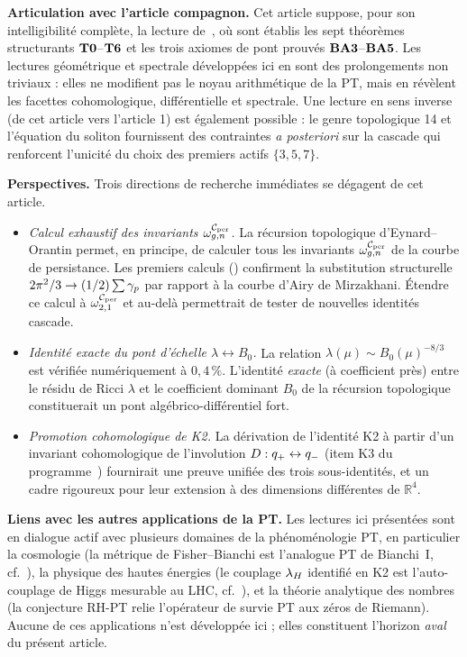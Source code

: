 \textbf{Articulation avec l'article compagnon.} Cet article suppose, pour son intelligibilité complète, la lecture de~\cite{PT_Article1_Foundations}, où sont établis les sept théorèmes structurants $\textbf{T0}$--$\textbf{T6}$ et les trois axiomes de pont prouvés $\textbf{BA3}$--$\textbf{BA5}$. Les lectures géométrique et spectrale développées ici en sont des prolongements non triviaux : elles ne modifient pas le noyau arithmétique de la PT, mais en révèlent les facettes cohomologique, différentielle et spectrale. Une lecture en sens inverse (de cet article vers l'article 1) est également possible : le genre topologique 14 et l'équation du soliton fournissent des contraintes \emph{a posteriori} sur la cascade qui renforcent l'unicité du choix des premiers actifs $\{3, 5, 7\}$.

\textbf{Perspectives.} Trois directions de recherche immédiates se dégagent de cet article.
\begin{itemize}[nosep,leftmargin=*]
\item \emph{Calcul exhaustif des invariants $\omega_{g,n}^{\mathcal{C}_{\rm per}}$.} La récursion topologique d'Eynard--Orantin permet, en principe, de calculer tous les invariants $\omega_{g,n}^{\mathcal{C}_{\rm per}}$ de la courbe de persistance. Les premiers calculs (\cite[\S 8]{PT_GeoFlow_PersistenceCurve}) confirment la substitution structurelle $2\pi^{2}/3 \to (1/2) \sum \gamma_{p}$ par rapport à la courbe d'Airy de Mirzakhani. Étendre ce calcul à $\omega_{2,1}^{\mathcal{C}_{\rm per}}$ et au-delà permettrait de tester de nouvelles identités cascade.
\item \emph{Identité exacte du pont d'échelle $\lambda \leftrightarrow B_0$.} La relation $\lambda(\mu) \sim B_0(\mu)^{-8/3}$ est vérifiée numériquement à $0{,}4\,\%$. L'identité \emph{exacte} (à coefficient près) entre le résidu de Ricci $\lambda$ et le coefficient dominant $B_0$ de la récursion topologique constituerait un pont algébrico-différentiel fort.
\item \emph{Promotion cohomologique de K2.} La dérivation de l'identité K2 à partir d'un invariant cohomologique de l'involution $D : q_{+} \leftrightarrow q_{-}$ (item K3 du programme~\cite{PT_NewMath_Consolidation}) fournirait une preuve unifiée des trois sous-identités, et un cadre rigoureux pour leur extension à des dimensions différentes de $\mathbb R^{4}$.
\end{itemize}

\textbf{Liens avec les autres applications de la PT.} Les lectures ici présentées sont en dialogue actif avec plusieurs domaines de la phénoménologie PT, en particulier la cosmologie (la métrique de Fisher--Bianchi est l'analogue PT de Bianchi~I, cf.~\cite{companion_M3,companion_M5}), la physique des hautes énergies (le couplage $\lambda_H$ identifié en K2 est l'auto-couplage de Higgs mesurable au LHC, cf.~\cite{companion_M5}), et la théorie analytique des nombres (la conjecture RH-PT relie l'opérateur de survie PT aux zéros de Riemann). Aucune de ces applications n'est développée ici ; elles constituent l'horizon \emph{aval} du présent article.

